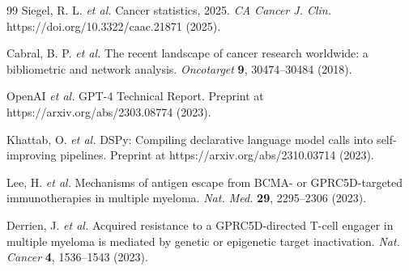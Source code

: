 \begin{thebibliography}{99}
Siegel, R. L. \textit{et al.} Cancer statistics, 2025. \textit{CA Cancer J. Clin.} https://doi.org/10.3322/caac.21871 (2025).

Cabral, B. P. \textit{et al.} The recent landscape of cancer research worldwide: a bibliometric and network analysis. \textit{Oncotarget} \textbf{9}, 30474--30484 (2018).

OpenAI \textit{et al.} GPT-4 Technical Report. Preprint at https://arxiv.org/abs/2303.08774 (2023).

Khattab, O. \textit{et al.} DSPy: Compiling declarative language model calls into self-improving pipelines. Preprint at https://arxiv.org/abs/2310.03714 (2023).

Lee, H. \textit{et al.} Mechanisms of antigen escape from BCMA- or GPRC5D-targeted immunotherapies in multiple myeloma. \textit{Nat. Med.} \textbf{29}, 2295--2306 (2023).

Derrien, J. \textit{et al.} Acquired resistance to a GPRC5D-directed T-cell engager in multiple myeloma is mediated by genetic or epigenetic target inactivation. \textit{Nat. Cancer} \textbf{4}, 1536--1543 (2023).

\end{thebibliography}

%
%
%
%
